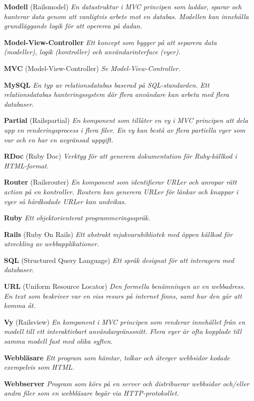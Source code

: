 \documentclass[a4paper, twoside, 11pt, titlepage]{article}
\begin{document}
	\textbf{Modell} (Railsmodel) \emph{En datastruktur i MVC principen som laddar, sparar och hanterar data genom att vanligtvis arbete mot en databas. Modellen kan innehålla grundläggande logik för att opererea på dadan.}

	\textbf{Model-View-Controller} \emph{Ett koncept som bygger på att separera data (modeller), logik (kontroller) och användarinterface (vyer).}

	\textbf{MVC} (Model-View-Controller) \emph{Se Model-View-Controller.}

	\textbf{MySQL} \emph{En typ av relationsdatabas baserad på SQL-standarden. Ett relationsdatabas hanteringssystem där flera användare kan arbeta med flera databaser.}

	\textbf{Partial} (Railspartial) \emph{En komponent som tillåter en vy i MVC principen att dela upp en renderingsprocess i flera filer. En vy kan bestå av flera partiella vyer som var och en har en avgränsad uppgift.}

	\textbf{RDoc} (Ruby Doc) \emph{Verktyg för att generera dokumentation för Ruby-källkod i HTML-format.}

	\textbf{Router} (Railsrouter) \emph{En komponent som identifierar URLer och anropar rätt action på en kontroller. Routern kan generera URLer för länkar och knappar i vyer så hårdkodade URLer kan undvikas.}

	\textbf{Ruby} \emph{Ett objektorienterat programmeringsspråk.}

	\textbf{Rails} (Ruby On Rails) \emph{Ett abstrakt mjukvarubibliotek med öppen källkod för utveckling av webbapplikationer.}

	\textbf{SQL} (Structured Query Language) \emph{Ett språk designat för att interagera med databaser.}

	\textbf{URL} (Uniform Resource Locator) \emph{Den formella benämningen av en webbadress. En text som beskriver var en viss resurs på internet finns, samt hur den går att komma åt.}

	\textbf{Vy} (Railsview) \emph{En komponent i MVC principen som renderar innehållet från en modell till ett interaktivbart användargränssnitt. Flera vyer är ofta kopplade till samma modell fast med olika syften.}

	\textbf{Webbläsare} \emph{Ett program som hämtar, tolkar och återger webbsidor kodade exempelvis som HTML.}

	\textbf{Webbserver} \emph{Program som körs på en server och distribuerar webbsidor och/eller andra filer som en webbläsare begär via HTTP-protokollet.}
\end{document}
